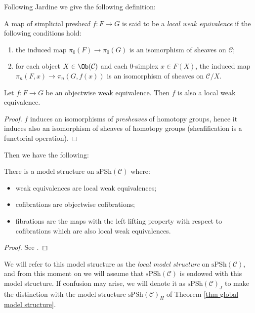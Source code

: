 Following Jardine  we give the following definition:

\begin{defin}
A map of simplicial presheaf $f \colon F \to G$ is said to be a \emph{local weak equivalence} if the following conditions hold:
\begin{enumerate}
\item the induced map $\pi_0(F) \to \pi_0(G)$ is an isomorphism of sheaves on $\mathcal C$;

\item for each object $X \in \Ob(\mathcal C)$ and each 0-simplex $x \in F(X)$, the induced map $\pi_n(F,x) \to \pi_n(G,f(x))$ is an isomorphism of sheaves on $\mathcal C / X$.
\end{enumerate}
\end{defin}

\begin{lemma} \label{lemma objectwise w.e. are local}
Let $f \colon F \to G$ be an objectwise weak equivalence. Then $f$ is also a local weak equivalence.
\end{lemma}

\begin{proof}
$f$ induces an isomorphisms of \emph{presheaves} of homotopy groups, hence it induces also an isomorphism of sheaves of homotopy groups (sheafification is a functorial operation).
\end{proof}

Then we have the following:

\begin{thm} \label{thm local model structure}
There is a model structure on $\mathrm{sPSh}(\mathcal C)$ where:
\begin{itemize}
\item weak equivalences are local weak equivalences;
\item cofibrations are objectwise cofibrations;
\item fibrations are the maps with the left lifting property with respect to cofibrations which are also local weak equivalences.
\end{itemize}
\end{thm}

\begin{proof}
See .
\end{proof}

We will refer to this model structure as the \emph{local model structure} on $\mathrm{sPSh}(\mathcal C)$, and from this moment on we will assume that $\mathrm{sPSh}(\mathcal C)$ is endowed with this model structure. If confusion may arise, we will denote it as $\mathrm{sPSh}(\mathcal C)_J$ to make the distinction with the model structure $\mathrm{sPSh}(\mathcal C)_H$ of Theorem \ref{thm global model structure}.

